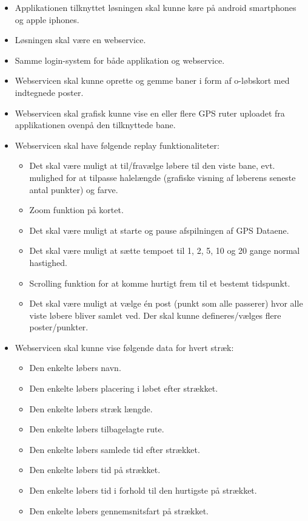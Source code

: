 \begin{itemize}
	\item Applikationen tilknyttet løsningen skal kunne køre på android smartphones og apple iphones.
	\item Løsningen skal være en webservice.
	\item Samme login-system for både applikation og webservice.
	\item Webservicen skal kunne oprette og gemme baner i form af o-løbskort med indtegnede poster.
	\item Webservicen skal grafisk kunne vise en eller flere GPS ruter uploadet fra applikationen ovenpå den tilknyttede bane.
	\item Webservicen skal have følgende replay funktionaliteter:
	\begin{itemize}
		\item Det skal være muligt at til/fravælge løbere til den viste bane, evt. mulighed for at tilpasse halelængde (grafiske visning af løberens seneste antal punkter) og farve.
		\item Zoom funktion på kortet.
		\item Det skal være muligt at starte og pause afspilningen af GPS Dataene.
		\item Det skal være muligt at sætte tempoet til 1, 2, 5, 10 og 20 gange normal hastighed.
		\item Scrolling funktion for at komme hurtigt frem til et bestemt tidspunkt.
		\item Det skal være muligt at vælge én post (punkt som alle passerer) hvor alle viste løbere bliver samlet ved. Der skal kunne defineres/vælges flere poster/punkter.
	\end{itemize}
	\item Webservicen skal kunne vise følgende data for hvert stræk:
	\begin{itemize}
		\item Den enkelte løbers navn.
		\item Den enkelte løbers placering i løbet efter strækket.
		\item Den enkelte løbers stræk længde.
		\item Den enkelte løbers tilbagelagte rute.
		\item Den enkelte løbers samlede tid efter strækket.
		\item Den enkelte løbers tid på strækket.
		\item Den enkelte løbers tid i forhold til den hurtigste på strækket.
		\item Den enkelte løbers gennemsnitsfart på strækket.

\end{itemize}
\end{itemize}
